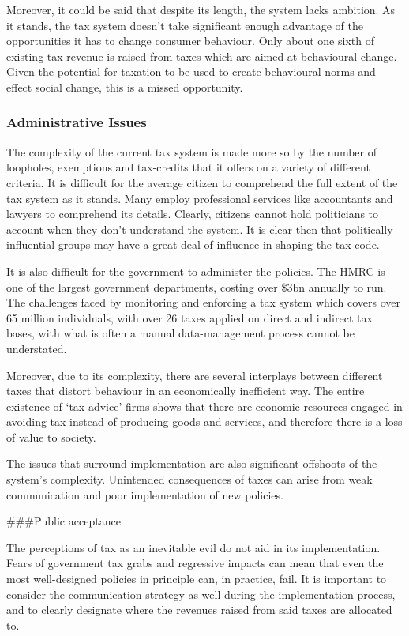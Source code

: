 \documentclass[]{article}
\begin{document}
Moreover, it could be said that despite its length, the system lacks
ambition. As it stands, the tax system doesn't take significant enough
advantage of the opportunities it has to change consumer behaviour. Only
about one sixth of existing tax revenue is raised from taxes which are
aimed at behavioural change. Given the potential for taxation to be used
to create behavioural norms and effect social change, this is a missed
opportunity.

\hypertarget{administrative-issues}{%
\subsubsection{Administrative Issues}\label{administrative-issues}}

The complexity of the current tax system is made more so by the number
of loopholes, exemptions and tax-credits that it offers on a variety of
different criteria. It is difficult for the average citizen to
comprehend the full extent of the tax system as it stands. Many employ
professional services like accountants and lawyers to comprehend its
details. Clearly, citizens cannot hold politicians to account when they
don't understand the system. It is clear then that politically
influential groups may have a great deal of influence in shaping the tax
code.

It is also difficult for the government to administer the policies. The
HMRC is one of the largest government departments, costing over \$3bn
annually to run. The challenges faced by monitoring and enforcing a tax
system which covers over 65 million individuals, with over 26 taxes
applied on direct and indirect tax bases, with what is often a manual
data-management process cannot be understated.

Moreover, due to its complexity, there are several interplays between
different taxes that distort behaviour in an economically inefficient
way. The entire existence of `tax advice' firms shows that there are
economic resources engaged in avoiding tax instead of producing goods
and services, and therefore there is a loss of value to society.

The issues that surround implementation are also significant offshoots
of the system's complexity. Unintended consequences of taxes can arise
from weak communication and poor implementation of new policies.

\#\#\#Public acceptance

The perceptions of tax as an inevitable evil do not aid in its
implementation. Fears of government tax grabs and regressive impacts can
mean that even the most well-designed policies in principle can, in
practice, fail. It is important to consider the communication strategy
as well during the implementation process, and to clearly designate
where the revenues raised from said taxes are allocated to.
\end{document}

